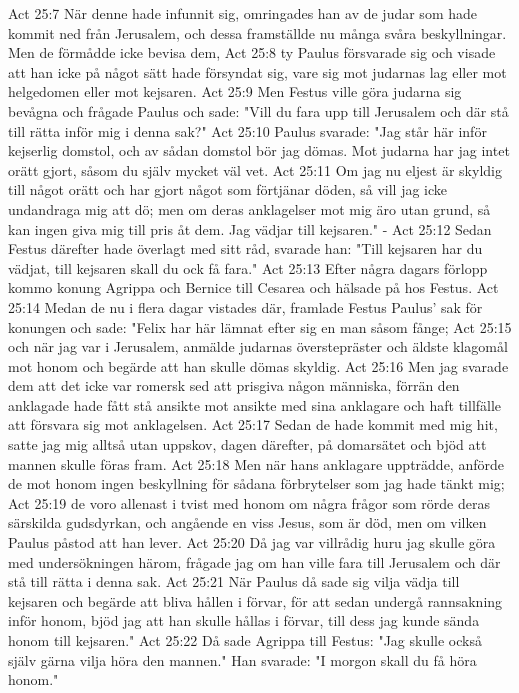 Act 25:7  När denne hade infunnit sig, omringades han av de judar som hade kommit ned från Jerusalem, och dessa framställde nu många svåra beskyllningar. Men de förmådde icke bevisa dem,
Act 25:8  ty Paulus försvarade sig och visade att han icke på något sätt hade försyndat sig, vare sig mot judarnas lag eller mot helgedomen eller mot kejsaren.
Act 25:9  Men Festus ville göra judarna sig bevågna och frågade Paulus och sade: "Vill du fara upp till Jerusalem och där stå till rätta inför mig i denna sak?"
Act 25:10  Paulus svarade: "Jag står här inför kejserlig domstol, och av sådan domstol bör jag dömas. Mot judarna har jag intet orätt gjort, såsom du själv mycket väl vet.
Act 25:11  Om jag nu eljest är skyldig till något orätt och har gjort något som förtjänar döden, så vill jag icke undandraga mig att dö; men om deras anklagelser mot mig äro utan grund, så kan ingen giva mig till pris åt dem. Jag vädjar till kejsaren." -
Act 25:12  Sedan Festus därefter hade överlagt med sitt råd, svarade han: "Till kejsaren har du vädjat, till kejsaren skall du ock få fara."
Act 25:13  Efter några dagars förlopp kommo konung Agrippa och Bernice till Cesarea och hälsade på hos Festus.
Act 25:14  Medan de nu i flera dagar vistades där, framlade Festus Paulus' sak för konungen och sade: "Felix har här lämnat efter sig en man såsom fånge;
Act 25:15  och när jag var i Jerusalem, anmälde judarnas överstepräster och äldste klagomål mot honom och begärde att han skulle dömas skyldig.
Act 25:16  Men jag svarade dem att det icke var romersk sed att prisgiva någon människa, förrän den anklagade hade fått stå ansikte mot ansikte med sina anklagare och haft tillfälle att försvara sig mot anklagelsen.
Act 25:17  Sedan de hade kommit med mig hit, satte jag mig alltså utan uppskov, dagen därefter, på domarsätet och bjöd att mannen skulle föras fram.
Act 25:18  Men när hans anklagare uppträdde, anförde de mot honom ingen beskyllning för sådana förbrytelser som jag hade tänkt mig;
Act 25:19  de voro allenast i tvist med honom om några frågor som rörde deras särskilda gudsdyrkan, och angående en viss Jesus, som är död, men om vilken Paulus påstod att han lever.
Act 25:20  Då jag var villrådig huru jag skulle göra med undersökningen härom, frågade jag om han ville fara till Jerusalem och där stå till rätta i denna sak.
Act 25:21  När Paulus då sade sig vilja vädja till kejsaren och begärde att bliva hållen i förvar, för att sedan undergå rannsakning inför honom, bjöd jag att han skulle hållas i förvar, till dess jag kunde sända honom till kejsaren."
Act 25:22  Då sade Agrippa till Festus: "Jag skulle också själv gärna vilja höra den mannen." Han svarade: "I morgon skall du få höra honom."
